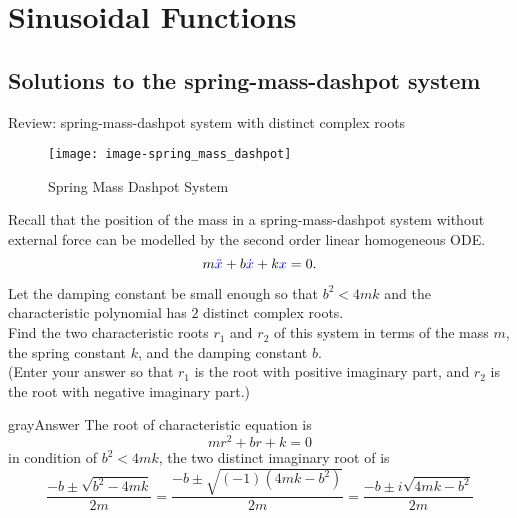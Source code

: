 \section{Sinusoidal Functions}
\subsection{Solutions to the spring-mass-dashpot system}
\begin{exercise}
  Review: spring-mass-dashpot system with distinct complex roots
\end{exercise}
\begin{figure}[ht!]
  \centering
  \texttt{[image: image-spring\_mass\_dashpot]}
  \caption{Spring Mass Dashpot System}
\end{figure}

Recall that the position of the mass in a spring-mass-dashpot system without external force can be modelled
by the second order linear homogeneous ODE.
\begin{equation*}
  m {\color{blue}{\ddot{x}}}  + b {\color{blue}{\dot{x}}}  + k {\color{blue}{x}}  =0.
\end{equation*}

Let the damping constant be small enough so that $b^2 < 4mk$ and the characteristic polynomial has
$2$ distinct complex roots.\\
Find the two characteristic roots $r_1$ and $r_2$ of this system in terms of the mass $m$,
the spring constant $k$, and the damping constant $b$.\\
(Enter your answer so that $r_1$ is the root with positive imaginary part, and $r_2$ is the root
with negative imaginary part.)

\begin{mybox}{gray}{Answer}
  The root of characteristic equation is
  \begin{equation*}
    mr^2 + br + k = 0 
  \end{equation*}
  in condition of $b^2 < 4mk$, the two distinct imaginary root of is
  \begin{equation*}
    \displaystyle \frac{-b \pm \sqrt{b^2 - 4mk}}{2m} \displaystyle =
    \displaystyle \frac{-b \pm \sqrt{(-1)(4mk -b^2)}}{2m} \displaystyle =
    \displaystyle \frac{-b \pm i\sqrt{4mk -b^2}}{2m}
  \end{equation*}
\end{mybox}

